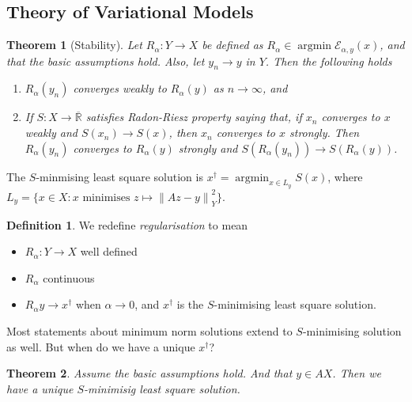 \documentclass[12pt]{article}
\newtheorem{theorem}{Theorem}[section]
\theoremstyle{definition}
\newtheorem{definition}{Definition}[section]
\newcommand{\real}{\mathbb{R}}   %
\DeclareMathOperator{\argmin}{argmin}
\newcommand\norm[1]{\left\lVert#1\right\rVert}
\begin{document}
\subsection{Theory of Variational Models}
\begin{theorem}[Stability]
    Let $R_\alpha:Y\to X$ be defined as $R_\alpha\in \argmin \mathcal{E}_{\alpha,y}(x)$, and that the basic assumptions hold. Also, let $y_n\to y$ in $Y$. Then the following holds
    \begin{enumerate}[label=(\alph*)]
        \item $R_\alpha(y_n)$ converges weakly to $ R_\alpha(y)$ as $n\to\infty$, and
        \item If $S:X\to\overline{\real}$ satisfies Radon-Riesz property saying that, if $x_n$ converges to $x$ weakly and $S(x_n)\to S(x)$, then $x_n$ converges to $x$ strongly. Then $R_\alpha(y_n)$ converges to $R_\alpha(y)$ strongly and $S(R_\alpha(y_n))\to S(R_\alpha(y))$.
    \end{enumerate}
\end{theorem}

The $S$-minmising least square solution is $x^\dagger =\argmin_{x\in L_y} S(x)$, where $L_y= \big\{x\in X: x \text{ minimises } z\mapsto \norm{Az-y}_Y^2\big\}$.

\begin{definition}
    We redefine \textit{regularisation} to mean
    \begin{itemize}
        \item $R_\alpha:Y\to X$ well defined
        \item $R_\alpha$ continuous
        \item $R_\alpha y\to x^\dagger $ when $\alpha\to 0$, and $x^\dagger $ is the $S$-minimising least square solution. 
    \end{itemize}
\end{definition}
Most statements about minimum norm solutions extend to $S$-minimising solution as well. But when do we have a unique $x^\dagger $?

\begin{theorem}
    Assume the basic assumptions hold. And that $y\in AX$. Then we have a unique $S$-minimisig least square solution.
\end{theorem}
\end{document}
